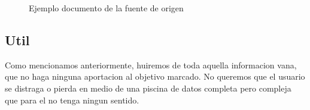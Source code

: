 \begin{figure}[h]
\centering
{}
\caption{Ejemplo documento de la fuente de origen}
\end{figure}
\begin{comment}
    
\end{co}
\begin{itemize}

    \item Informacion precisa
    \item Datos contrastados
\end{itemize}
\end{comment}


\subsection{Util}
Como mencionamos anteriormente, huiremos de toda aquella informacion vana, que no haga ninguna aportacion
al objetivo marcado. No queremos que el usuario se distraga o pierda en medio de una piscina de datos completa
pero compleja que para el no tenga ningun sentido.\\

